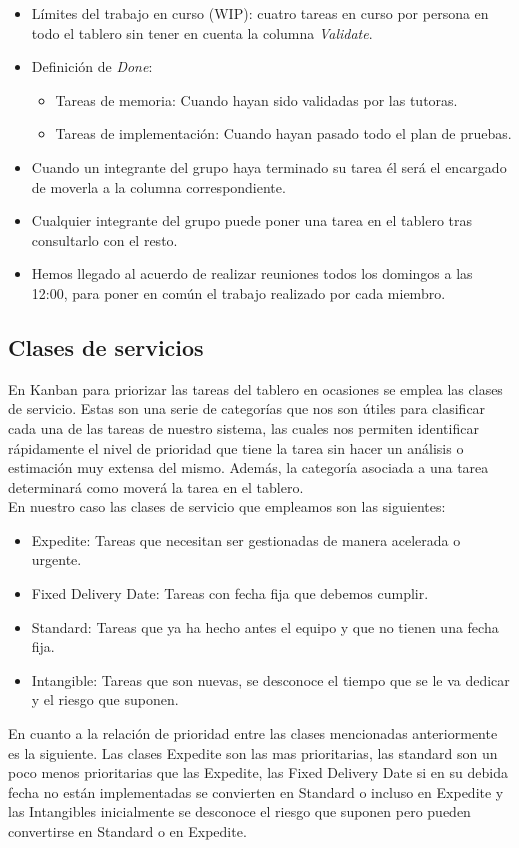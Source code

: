 \begin{itemize}
    \item Límites del trabajo en curso (WIP): cuatro tareas en curso por persona en todo el tablero sin tener en cuenta la columna \textit{Validate}.
    \item Definición de \textit{Done}:
          \begin{itemize}
              \item Tareas de memoria: Cuando hayan sido validadas por las tutoras.
              \item Tareas de implementación: Cuando hayan pasado todo el plan de pruebas.
          \end{itemize}
    \item Cuando un integrante del grupo haya terminado su tarea él será el encargado de moverla a la columna correspondiente.
    \item Cualquier integrante del grupo puede poner una tarea en el tablero tras consultarlo con el resto.
    \item Hemos llegado al acuerdo de realizar reuniones todos los domingos a las 12:00, para poner en común el trabajo realizado por cada miembro.
\end{itemize}

\subsection{Clases de servicios}
En Kanban para priorizar las tareas del tablero en ocasiones se emplea las clases de servicio. Estas son una serie de categorías que nos son útiles para clasificar cada una de las tareas de nuestro sistema, las cuales nos permiten identificar rápidamente el nivel de prioridad que tiene la tarea sin hacer un análisis o estimación muy extensa del mismo. Además, la categoría asociada a una tarea determinará como moverá la tarea en el tablero.\\
En nuestro caso las clases de servicio que empleamos son las siguientes:
\begin{itemize}
    \item Expedite: Tareas que necesitan ser gestionadas de manera acelerada o urgente.
    \item Fixed Delivery Date: Tareas con fecha fija que debemos cumplir.
    \item Standard: Tareas que ya ha hecho antes el equipo y que no tienen una fecha fija.
    \item Intangible: Tareas que son nuevas, se desconoce el tiempo que se le va dedicar y el riesgo que suponen.
\end{itemize}
En cuanto a la relación de prioridad entre las clases mencionadas anteriormente es la siguiente. Las clases Expedite son las mas prioritarias, las standard son un poco menos prioritarias que las Expedite, las Fixed Delivery Date si en su debida fecha no están implementadas se convierten en Standard o incluso en Expedite y las Intangibles inicialmente se desconoce el riesgo que suponen pero pueden convertirse en Standard o en Expedite.

